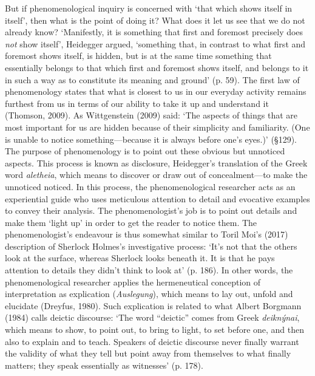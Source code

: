 \begin{adjmulticols}{2}{0mm}{0mm}
But if phenomenological inquiry is concerned with ‘that which shows itself in itself’, then what is the point of doing it? What does it let us see that we do not already know? ‘Manifestly, it is something that first and foremost precisely does \textit{not} show itself’, Heidegger argued, ‘something that, in contrast to what first and foremost shows itself, is hidden, but is at the same time something that essentially belongs to that which first and foremost shows itself, and belongs to it in such a way as to constitute its meaning and ground’ (p. 59). The first law of phenomenology states that what is closest to us in our everyday activity remains furthest from us in terms of our ability to take it up and understand it (Thomson, 2009). As Wittgenstein (2009) said: ‘The aspects of things that are most important for us are hidden because of their simplicity and familiarity. (One is unable to notice something—because it is always before one's eyes.)’ (§129). The purpose of phenomenology is to point out these obvious but unnoticed aspects. This process is known as disclosure, Heidegger’s translation of the Greek word \textit{aletheia}, which means to discover or draw out of concealment—to make the unnoticed noticed. In this process, the phenomenological researcher acts as an experiential guide who uses meticulous attention to detail and evocative examples to convey their analysis. The phenomenologist’s job is to point out details and make them ‘light up’ in order to get the reader to notice them. The phenomenologist’s endeavour is thus somewhat similar to Toril Moi’s (2017) description of Sherlock Holmes’s investigative process: ‘It’s not that the others look at the surface, whereas Sherlock looks beneath it. It is that he pays attention to details they didn’t think to look at’ (p. 186). In other words, the phenomenological researcher applies the hermeneutical conception of interpretation as explication (\textit{Auslegung}), which means to lay out, unfold and elucidate (Dreyfus, 1980). Such explication is related to what Albert Borgmann (1984) calls deictic discourse: ‘The word “deictic” comes from Greek \textit{deiknýnai}, which means to show, to point out, to bring to light, to set before one, and then also to explain and to teach. Speakers of deictic discourse never finally warrant the validity of what they tell but point away from themselves to what finally matters; they speak essentially as witnesses’ (p. 178). 


\end{adjmulticols}
